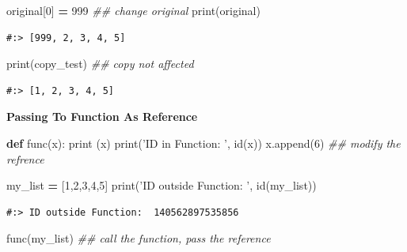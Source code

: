 \documentclass[
]{book}
\newenvironment{Shaded}{\begin{snugshade}}{\end{snugshade}}
\newcommand{\BuiltInTok}[1]{#1}
\newcommand{\CommentTok}[1]{\textcolor[rgb]{0.37,0.37,0.37}{\textit{#1}}}
\newcommand{\DecValTok}[1]{\textcolor[rgb]{0.06,0.06,0.06}{#1}}
\newcommand{\KeywordTok}[1]{\textcolor[rgb]{0.27,0.27,0.27}{\textbf{#1}}}
\newcommand{\NormalTok}[1]{#1}
\newcommand{\OperatorTok}[1]{\textcolor[rgb]{0.43,0.43,0.43}{\textbf{#1}}}
\newcommand{\StringTok}[1]{\textcolor[rgb]{0.5,0.5,0.5}{#1}}
\begin{document}
\begin{Shaded}
\begin{Highlighting}[]
\NormalTok{original[}\DecValTok{0}\NormalTok{] }\OperatorTok{=} \DecValTok{999}  \CommentTok{## change original}
\BuiltInTok{print}\NormalTok{(original)    }
\end{Highlighting}
\end{Shaded}

\begin{verbatim}
#:> [999, 2, 3, 4, 5]
\end{verbatim}

\begin{Shaded}
\begin{Highlighting}[]
\BuiltInTok{print}\NormalTok{(copy_test)   }\CommentTok{## copy not affected}
\end{Highlighting}
\end{Shaded}

\begin{verbatim}
#:> [1, 2, 3, 4, 5]
\end{verbatim}

\textbf{Passing To Function As Reference}

\begin{Shaded}
\begin{Highlighting}[]
\KeywordTok{def}\NormalTok{ func(x):}
    \BuiltInTok{print}\NormalTok{ (x)}
    \BuiltInTok{print}\NormalTok{(}\StringTok{'ID in Function:      '}\NormalTok{, }\BuiltInTok{id}\NormalTok{(x))}
\NormalTok{    x.append(}\DecValTok{6}\NormalTok{)    }\CommentTok{## modify the refrence}
    
\NormalTok{my_list }\OperatorTok{=}\NormalTok{ [}\DecValTok{1}\NormalTok{,}\DecValTok{2}\NormalTok{,}\DecValTok{3}\NormalTok{,}\DecValTok{4}\NormalTok{,}\DecValTok{5}\NormalTok{]}
\BuiltInTok{print}\NormalTok{(}\StringTok{'ID outside Function: '}\NormalTok{, }\BuiltInTok{id}\NormalTok{(my_list))}
\end{Highlighting}
\end{Shaded}

\begin{verbatim}
#:> ID outside Function:  140562897535856
\end{verbatim}

\begin{Shaded}
\begin{Highlighting}[]
\NormalTok{func(my_list)  }\CommentTok{## call the function, pass the reference}
\end{Highlighting}
\end{Shaded}
\end{document}
